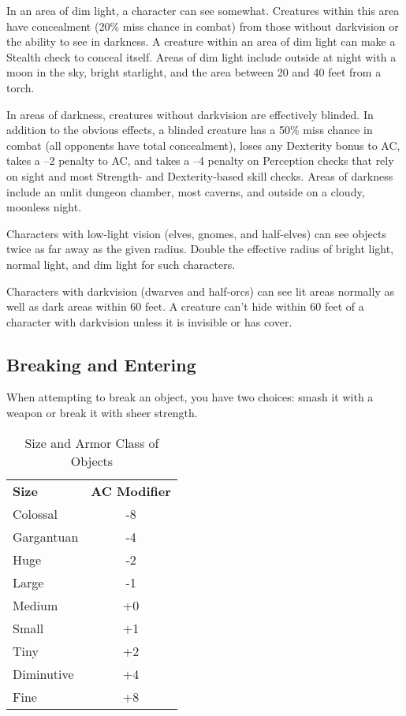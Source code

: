 In an area of dim light, a character can see somewhat. Creatures within this area have concealment (20\% miss chance in combat) from those without darkvision or the ability to see in darkness. A creature within an area of dim light can make a Stealth check to conceal itself. Areas of dim light include outside at night with a moon in the sky, bright starlight, and the area between 20 and 40 feet from a torch.
				
In areas of darkness, creatures without darkvision are effectively blinded. In addition to the obvious effects, a blinded creature has a 50\% miss chance in combat (all opponents have total concealment), loses any Dexterity bonus to AC, takes a --2 penalty to AC, and takes a --4 penalty on Perception checks that rely on sight and most Strength- and Dexterity-based skill checks. Areas of darkness include an unlit dungeon chamber, most caverns, and outside on a cloudy, moonless night.
				
Characters with low-light vision (elves, gnomes, and half-elves) can see objects twice as far away as the given radius. Double the effective radius of bright light, normal light, and dim light for such characters.
				
Characters with darkvision (dwarves and half-orcs) can see lit areas normally as well as dark areas within 60 feet. A creature can't hide within 60 feet of a character with darkvision unless it is invisible or has cover.
				
\subsection{Breaking and Entering}

				
When attempting to break an object, you have two choices: smash it with a weapon or break it with sheer strength.

\begin{table}[htb]
\sffamily
{}
\caption{Size and Armor Class of Objects}
\centering
\begin{tabular}{l c}
\textbf{Size} & \textbf{AC Modifier}\\
Colossal & -8\\
Gargantuan & -4\\
Huge & -2\\
Large & -1\\
Medium & +0\\
Small & +1\\
Tiny & +2\\
Diminutive & +4\\
Fine & +8\\
\end{tabular}
\end{table}



